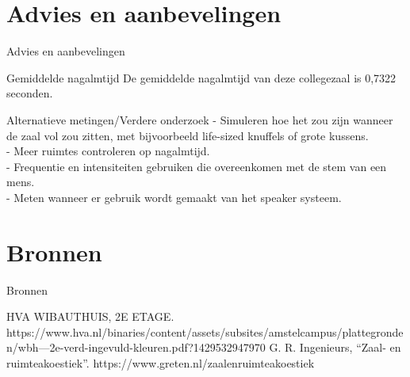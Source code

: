\documentclass{beamer}
\begin{document}
\section{Advies en aanbevelingen}
\begin{frame}{Advies en aanbevelingen}
  \begin{block}{Gemiddelde nagalmtijd}
    De gemiddelde nagalmtijd van deze collegezaal is 0,7322 seconden.
  \end{block}
  \pause
  \begin{block}{Alternatieve metingen/Verdere onderzoek}
  - Simuleren hoe het zou zijn wanneer de zaal vol zou zitten, met bijvoorbeeld life-sized knuffels of grote kussens.\\
  - Meer ruimtes controleren op nagalmtijd.\\
  - Frequentie en intensiteiten gebruiken die overeenkomen met de stem van een mens.\\
  - Meten wanneer er gebruik wordt gemaakt van het speaker systeem.
 \end{block} 
\end{frame}




\section{Bronnen}
\begin{frame}[shrink=30]{Bronnen}
  \begin{thebibliography}{9}

 HVA WIBAUTHUIS, 2E ETAGE. https://www.hva.nl/binaries/content/assets/subsites/amstelcampus/plattegronden/wbh---2e-verd-ingevuld-kleuren.pdf?1429532947970
    G. R. Ingenieurs, “Zaal- en ruimteakoestiek”. https://www.greten.nl/zaalenruimteakoestiek

\end{thebibliography}
\end{frame}
\end{document}
